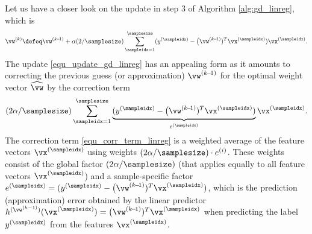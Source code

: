 \documentclass[12pt]{report}
\begin{document}
Let us have a closer look on the update in step $3$ of Algorithm \ref{alg:gd_linreg}, which is 
\begin{equation}
\label{equ_update_gd_linreg}
\vw^{(k)} \defeq \vw^{(k\!-\!1)} + \alpha (2/\samplesize) \sum_{\sampleidx=1}^{\samplesize} (y^{(\sampleidx)} - \big(\vw^{(k\!-\!1)})^{T} \vx^{(\sampleidx)})\vx^{(\sampleidx)}. 
\end{equation}
The update \eqref{equ_update_gd_linreg} has an appealing form as it amounts to correcting the previous guess (or approximation) $\vw^{(k\!-\!1)}$ for 
the optimal weight vector $\widehat{\vw}$ by the correction term 
\begin{equation}
\label{equ_corr_term_linreg}
 (2\alpha/\samplesize) \sum_{\sampleidx=1}^{\samplesize} \underbrace{(y^{(\sampleidx)} - \big(\vw^{(k\!-\!1)})^{T} \vx^{(\sampleidx)})}_{e^{(\sampleidx)}} \vx^{(\sampleidx)}. 
\end{equation}
The correction term \eqref{equ_corr_term_linreg} is a weighted average of the feature vectors $\vx^{(\sampleidx)}$ using weights $(2\alpha/\samplesize) \cdot e^{(i)}$. 
These weights consist of the global factor $(2\alpha/\samplesize)$ (that applies equally to all feature vectors $\vx^{(\sampleidx)}$) and a sample-specific factor 
$e^{(\sampleidx)} = (y^{(\sampleidx)} - \big(\vw^{(k\!-\!1)})^{T} \vx^{(\sampleidx)})$, which is the prediction (approximation) error obtained by the linear predictor 
$h^{(\vw^{(k-1)})}(\vx^{(\sampleidx)}) =   \big(\vw^{(k\!-\!1)})^{T} \vx^{(\sampleidx)}$ when predicting the label $y^{(\sampleidx)}$ from the features $\vx^{(\sampleidx)}$. 

\begin{center}
\end{center}

\end{document}
